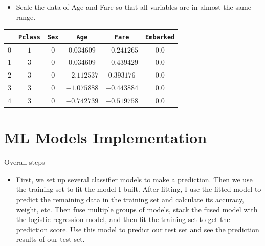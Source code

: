 \documentclass[
size=14pt,
paper=smartboard,  %
mode=present, 		%
display=slides, 	%
style=tuliplab,  	%
pauseslide,
fleqn,leqno]{powerdot}
\begin{document}
	
	\begin{slide}[toc=,bm=]{}
		\vspace{-0.6cm}
		\begin{itemize}
			\item 
			Scale the data of Age and Fare so that all variables are in almost the same range.
		\end{itemize}
		\begin{center}
			\begin{tabular}{c| c c c c c}
				\toprule
				{}  & \texttt{Pclass} & \texttt{Sex}  & \texttt{Age} & \texttt{Fare}  & \texttt{Embarked}\\
				\midrule
				$0$
				&  {$1$} &  {$0$} &  {$0.034609$} &  {$-0.241265$} &  {$0.0$} \\
				$1$
				&  {$3$} &  {$0$} &  {$0.034609$} &  {$-0.439429$} &  {$0.0$} \\
				$2$
				&  {$3$} &  {$0$} &  {$-2.112537$} &  {$0.393176$} &  {$0.0$} \\
				$3$
				&  {$3$} &  {$0$} &  {$-1.075888$} &  {$-0.443884$} &  {$0.0$} \\
				$4$
				&  {$3$} &  {$0$} &  {$-0.742739$} &  {$-0.519758$} &  {$0.0$} \\
				\bottomrule
			\end{tabular}
		\end{center}	
	\end{slide}
	
	
	\section{ML Models Implementation}
	
	
	\begin{slide}{Overall steps}
		\begin{itemize}
			\item
			First, we set up several classifier models to make a prediction. Then we use the training set to fit the model I built. After fitting, I use the fitted model to predict the remaining data in the training set and calculate its accuracy, weight, etc. Then fuse multiple groups of models, stack the fused model with the logistic regression model, and then fit the training set to get the prediction score. Use this model to predict our test set and see the prediction results of our test set.
		\end{itemize}
	\end{slide}
	
\end{document}
